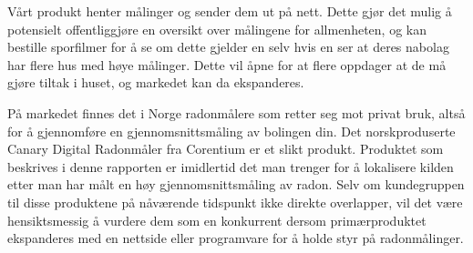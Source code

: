 Vårt produkt henter målinger og sender dem ut på nett. Dette gjør det mulig å potensielt offentliggjøre en oversikt over målingene for allmenheten, og kan bestille sporfilmer for å se om dette gjelder en selv hvis en ser at deres nabolag har flere hus med høye målinger. Dette vil åpne for at flere oppdager at de må gjøre tiltak i huset, og markedet kan da ekspanderes.

På markedet finnes det i Norge radonmålere som retter seg mot privat bruk, altså for å gjennomføre en gjennomsnittsmåling av bolingen din. Det norskproduserte Canary Digital Radonmåler fra Corentium er et slikt produkt. Produktet som beskrives i denne rapporten er imidlertid det man trenger for å lokalisere kilden etter man har målt en høy gjennomsnittsmåling av radon. Selv om kundegruppen til disse produktene på nåværende tidspunkt ikke direkte overlapper, vil det være hensiktsmessig å vurdere dem som en konkurrent dersom primærproduktet ekspanderes med en nettside eller programvare for å holde styr på radonmålinger.